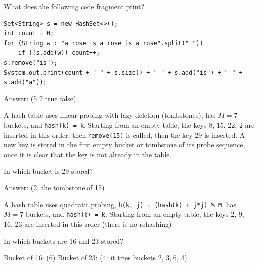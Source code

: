 \begin{question}
What does the following code fragment print?

\begin{lstlisting}
Set<String> s = new HashSet<>();
int count = 0;
for (String w : "a rose is a rose is a rose".split(" "))
    if (!s.add(w)) count++;
s.remove("is");
System.out.print(count + " " + s.size() + " " + s.add("is") + " " + s.add("a"));
\end{lstlisting}

Answer: \underline{\hspace{2in}} \ifanswers (5 2 true false)\fi
\end{question}

\begin{question}
A hash table uses linear probing with lazy deletion (tombstones), has $M = 7$ buckets, and \mbox{\lstinline|hash(k) = k|}. Starting from an empty table, the keys 8, 15, 22, 2 are inserted in this order, then \lstinline|remove(15)| is called, then the key 29 is inserted. A new key is stored in the first empty bucket or tombstone of its probe sequence, once it is clear that the key is not already in the table.

In which bucket is 29 stored?

Answer: \underline{\hspace{1in}} \ifanswers (2, the tombstone of 15)\fi
\end{question}

\begin{question}
A hash table uses quadratic probing, \lstinline|h(k, j) = (hash(k) + j*j) % M|, has $M = 7$ buckets, and \mbox{\lstinline|hash(k) = k|}. Starting from an empty table, the keys 2, 9, 16, 23 are inserted in this order (there is no rehashing).

In which buckets are 16 and 23 stored?

Bucket of 16: \underline{\hspace{1in}} \ifanswers (6)\fi
\qquad Bucket of 23: \underline{\hspace{1in}} \ifanswers (4: it tries buckets 2, 3, 6, 4)\fi
\end{question}

